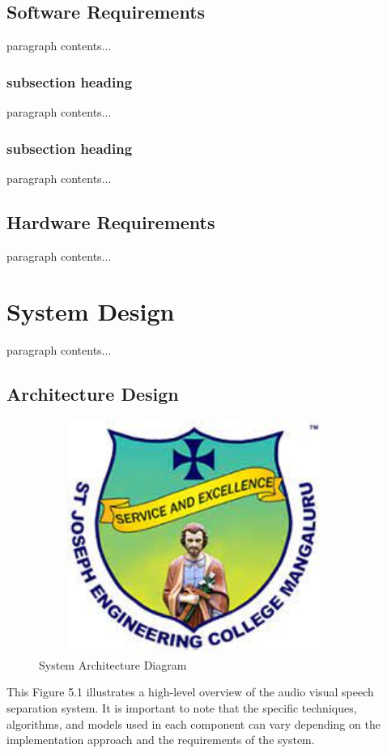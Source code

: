 \documentclass[12pt,a4paper]{report}
\begin{document}
\section{Software Requirements }
paragraph contents... 
\subsection{subsection heading}
paragraph contents... 
\subsection{subsection heading}
paragraph contents... 
\section{Hardware Requirements }
paragraph contents... 


\chapter{System Design}
paragraph contents... 
\section{Architecture Design}
\begin{figure}[hbtp]
\centering
\includegraphics[width=4in,height=3in]{./pic/sjeclogo.png}
\caption{System Architecture Diagram}
\end{figure}
This Figure 5.1 illustrates a high-level overview of the audio visual speech separation system. It is important to note that the specific techniques, algorithms, and models used in each component can vary depending on the implementation approach and the requirements of the system.
\end{document}
